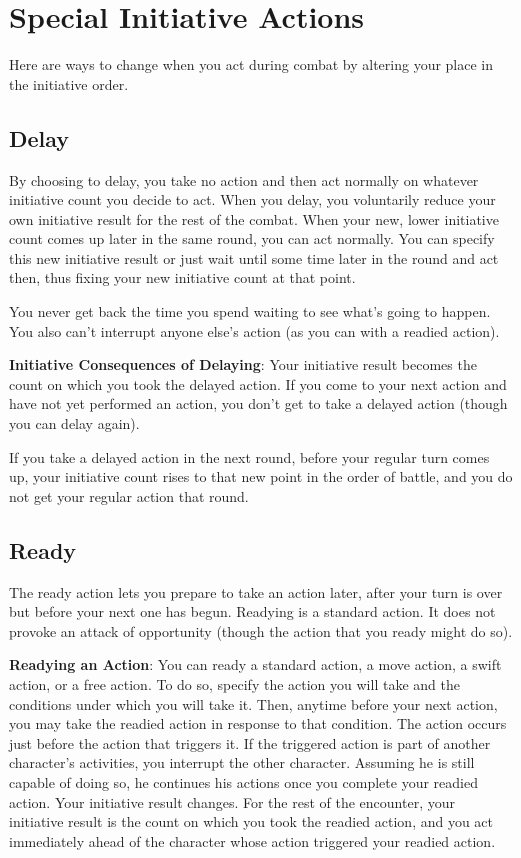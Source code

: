 \section{Special Initiative Actions}

				
Here are ways to change when you act during combat by altering your place in the initiative order.
				
\subsection{Delay}

				
By choosing to delay, you take no action and then act normally on whatever initiative count you decide to act. When you delay, you voluntarily reduce your own initiative result for the rest of the combat. When your new, lower initiative count comes up later in the same round, you can act normally. You can specify this new initiative result or just wait until some time later in the round and act then, thus fixing your new initiative count at that point.
				
You never get back the time you spend waiting to see what's going to happen. You also can't interrupt anyone else's action (as you can with a readied action).
				
\textbf{Initiative Consequences of Delaying}: Your initiative result becomes the count on which you took the delayed action. If you come to your next action and have not yet performed an action, you don't get to take a delayed action (though you can delay again).
				
If you take a delayed action in the next round, before your regular turn comes up, your initiative count rises to that new point in the order of battle, and you do not get your regular action that round.
				
\subsection{Ready}

				
The ready action lets you prepare to take an action later, after your turn is over but before your next one has begun. Readying is a standard action. It does not provoke an attack of opportunity (though the action that you ready might do so).
				
\textbf{Readying an Action}: You can ready a standard action, a move action, a swift action, or a free action. To do so, specify the action you will take and the conditions under which you will take it. Then, anytime before your next action, you may take the readied action in response to that condition. The action occurs just before the action that triggers it. If the triggered action is part of another character's activities, you interrupt the other character. Assuming he is still capable of doing so, he continues his actions once you complete your readied action. Your initiative result changes. For the rest of the encounter, your initiative result is the count on which you took the readied action, and you act immediately ahead of the character whose action triggered your readied action.
				
